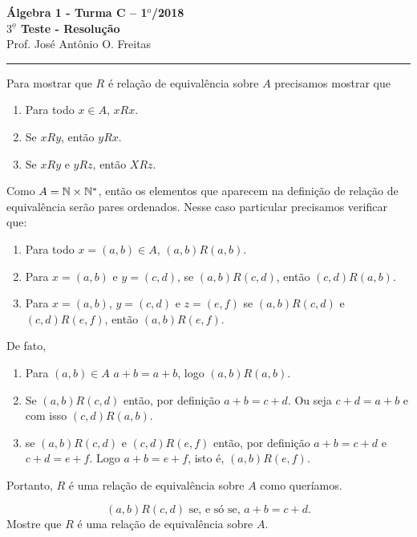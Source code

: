 \documentclass[12pt]{article}
\begin{document}


\begin{center}
{\Large\bf {\'A}lgebra 1 - Turma C -- 1$^{o}$/2018} \\ \vspace{9pt} {\large\bf
  $3^{\underline{o}}$ Teste - Resolu\c{c}\~ao}\\
\vspace{9pt} Prof. Jos{\'e} Ant{\^o}nio O. Freitas
\end{center}
\hrule

\vspace{.6cm}

\questao Para mostrar que $R$ é relação de equivalência sobre $A$ precisamos mostrar que
\begin{enumerate}
	\item Para todo $x \in A$, $xRx$.
	\item Se $xRy$, então $yRx$.
	\item Se $xRy$ e $yRz$, então $XRz$.
\end{enumerate}

Como $A = \mathbb{N} \times \mathbb{N}^*$, então os elementos que aparecem na definição de relação de equivalência serão pares ordenados. Nesse caso particular precisamos verificar que:
\begin{enumerate}
	\item Para todo $x = (a,b) \in A$, $(a,b)R(a,b)$.
	\item Para $x = (a,b)$ e $y = (c,d)$, se $(a,b)R(c,d)$, então $(c,d)R(a,b)$.
	\item Para $x = (a,b)$, $y = (c,d)$ e $z = (e,f)$ se $(a,b)R(c,d)$ e $(c,d)R(e,f)$, então $(a,b)R(e,f)$.
\end{enumerate}

De fato,
\begin{enumerate}
	\item Para $(a,b) \in A$ $a + b = a + b$, logo $(a,b)R(a,b)$.
	\item Se $(a,b)R(c,d)$ então, por definição $a + b = c + d$. Ou seja $c + d = a + b$ e com isso $(c,d)R(a,b)$.
	\item se $(a,b)R(c,d)$ e $(c,d)R(e,f)$ então, por definição $a + b = c + d$  e $c + d = e + f$. Logo $a + b = e + f$, isto é, $(a,b)R(e,f)$.
\end{enumerate}

Portanto, $R$ é uma relação de equivalência sobre $A$ como queríamos.

\[
	(a,b)R(c,d) \mbox{ se, e só se, } a + b = c + d.
\]
Mostre que $R$ é uma relação de equivalência sobre $A$.
\end{document}
